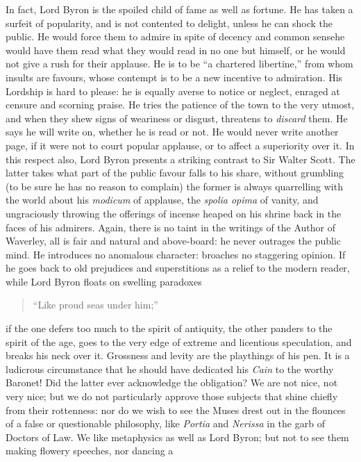In fact, Lord Byron is the spoiled child of fame as well as fortune.
He has taken a surfeit of popularity, and is not contented to delight,
unless he can shock the public. He would force them to admire in spite
of decency and common sense\textemdash he would have them read what they would
read in no one but himself, or he would not give a rush for their
applause. He is to be ``a chartered libertine,'' from whom insults are
favours, whose contempt is to be a new incentive to admiration. His
Lordship is hard to please: he is equally averse to notice or neglect,
enraged at censure and scorning praise. He tries the patience of the
town to the very utmost, and when they shew signs of weariness or
disgust, threatens to \emph{discard} them. He says he will write on, whether
he is read or not. He would never write another page, if it were not
to court popular applause, or to affect a superiority over it. In this
respect also, Lord Byron presents a striking contrast to Sir Walter
Scott. The latter takes what part of the public favour falls to his
share, without grumbling (to be sure he has no reason to complain) the
former is always quarrelling with the world about his \emph{modicum} of
applause, the \emph{spolia opima} of vanity, and ungraciously throwing the
offerings of incense heaped on his shrine back in the faces of his
admirers. Again, there is no taint in the writings of the Author of
Waverley, all is fair and natural and above-board: he never outrages
the public mind. He introduces no anomalous character: broaches no
staggering opinion. If he goes back to old prejudices and superstitions
as a relief to the modern reader, while Lord Byron floats on swelling
paradoxes\textemdash 
\begin{quote}
  ``Like proud seas under him;''

\end{quote}
if the one defers too much to the spirit of antiquity, the other
panders to the spirit of the age, goes to the very edge of extreme and
licentious speculation, and breaks his neck over it. Grossness and
levity are the playthings of his pen. It is a ludicrous circumstance
that he should have dedicated his \emph{Cain} to the worthy Baronet! Did the
latter ever acknowledge the obligation? We are not nice, not very nice;
but we do not particularly approve those subjects that shine chiefly
from their rottenness: nor do we wish to see the Muses drest out in
the flounces of a false or questionable philosophy, like \emph{Portia} and
\emph{Nerissa} in the garb of Doctors of Law. We like metaphysics as well as
Lord Byron; but not to see them making flowery speeches, nor dancing a
